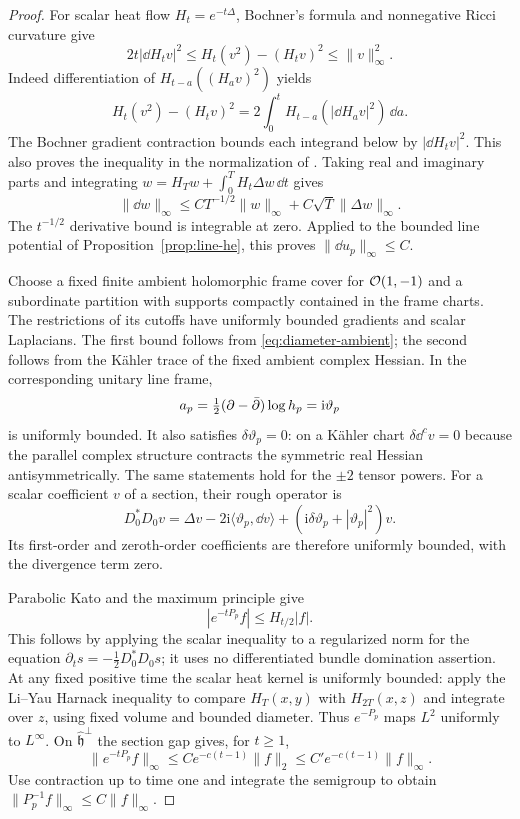 \begin{proof}
For scalar heat flow $H_t=e^{-t\Delta}$, Bochner's formula
and nonnegative Ricci curvature give
\begin{equation}\label{eq:reverse-poincare}
 2t|\dd H_tv|^2\le H_t(v^2)-(H_tv)^2
                                        \le\|v\|_\infty^2.
\end{equation}
Indeed differentiation of $H_{t-a}((H_av)^2)$ yields
\[
 H_t(v^2)-(H_tv)^2
       =2\int_0^t H_{t-a}(|\dd H_av|^2)\,\dd a.
\]
The Bochner gradient contraction bounds each integrand below
by $|\dd H_tv|^2$. This also proves the inequality in the
normalization of \cite[Section 2, Proposition 3]{Ledoux}.
Taking real and imaginary parts and integrating
$w=H_Tw+\int_0^T H_t\Delta w\,\dd t$ gives
\begin{equation}\label{eq:scalar-gradient-estimate}
 \|\dd w\|_\infty\le CT^{-1/2}\|w\|_\infty
                              +C\sqrt T\|\Delta w\|_\infty.
\end{equation}
The $t^{-1/2}$ derivative bound is integrable at zero.
Applied to the bounded line potential of
Proposition~\ref{prop:line-he}, this proves
$\|\dd u_p\|_\infty\le C$.

Choose a fixed finite ambient holomorphic frame cover for
$\mathcal O(1,-1)$ and a subordinate partition with supports
compactly contained in the frame charts. The restrictions
of its cutoffs have uniformly bounded gradients and scalar
Laplacians. The first bound follows from
\eqref{eq:diameter-ambient}; the second follows from the
Kähler trace of the fixed ambient complex Hessian.
In the corresponding unitary line frame,
\[
 a_p=\tfrac12(\partial-\bar\partial)\log h_p=\mathrm i\vartheta_p
\]
is uniformly bounded. It also satisfies $\delta\vartheta_p=0$:
on a Kähler chart $\delta\dd^c v=0$ because the parallel
complex structure contracts the symmetric real Hessian
antisymmetrically. The same statements hold for the
$\pm2$ tensor powers. For a scalar coefficient $v$ of a
section, their rough operator is
\begin{equation}\label{eq:local-rough-operator}
 D_0^*D_0v=\Delta v-2\mathrm i\langle\vartheta_p,\dd v\rangle
                +(\mathrm i\delta\vartheta_p+|\vartheta_p|^2)v.
\end{equation}
Its first-order and zeroth-order coefficients are therefore
uniformly bounded, with the divergence term zero.

Parabolic Kato and the maximum principle give
\[
 |e^{-tP_p}f|\le H_{t/2}|f|.
\]
This follows by applying the scalar inequality to a
regularized norm for the equation
$\partial_ts=-\tfrac12D_0^*D_0s$; it uses no differentiated
bundle domination assertion. At any fixed positive time
the scalar heat kernel is uniformly bounded: apply the
Li--Yau Harnack inequality to compare $H_T(x,y)$ with
$H_{2T}(x,z)$ and integrate over $z$, using fixed volume
and bounded diameter. Thus $e^{-P_p}$ maps $L^2$ uniformly
to $L^\infty$. On $\widehat{\mathfrak h}^{\perp}$ the
section gap gives, for $t\ge1$,
\[
 \|e^{-tP_p}f\|_\infty
          \le Ce^{-c(t-1)}\|f\|_2
          \le C'e^{-c(t-1)}\|f\|_\infty.
\]
Use contraction up to time one and integrate the semigroup
to obtain $\|P_p^{-1}f\|_\infty\le C\|f\|_\infty$.


\end{proof}
